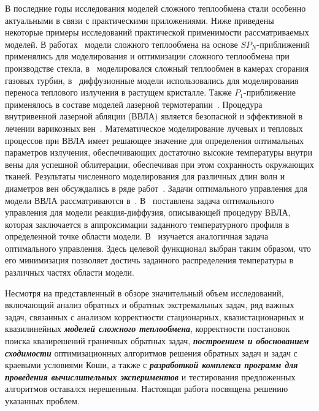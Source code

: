     В последние годы исследования моделей сложного теплообмена стали
    особенно актуальными в связи с практическими приложениями.
    Ниже приведены некоторые примеры исследований практической применимости
    рассматриваемых моделей.
    В работах~\cite{clever2012optimal, clever2014model,
        frank2010optimal, klar2005, lang2005adaptive, farina2011mathematical,
        Thommes2002, Pinnau2007b, Pinnau2004, Seaid2007, Larsen2002}
    модели сложного теплообмена на основе $SP_N$-приближений
    применялись для моделирования и оптимизации сложного теплообмена при
    производстве стекла, в~\cite{frank2004comparison, seaid2004efficient, Seaid2005}
    моделировался сложный теплообмен в
    камерах сгорания газовых турбин, в~\cite{Backofen2004} диффузионные модели
    использовались для моделирования переноса теплового излучения в
    растущем кристалле.
    Также $P_1$-приближение применялось в составе моделей
    лазерной термотерапии~\cite{Dombrovskii2015, Tse2012, Hubner2017}.
    Процедура внутривенной лазерной
    абляции (ВВЛА) является безопасной и эффективной в лечении варикозных
    вен~\cite{Endovenous_vandenBos2009}.
    Математическое моделирование лучевых и тепловых процессов
    при ВВЛА имеет решающее значение для определения оптимальных
    параметров излучения, обеспечивающих достаточно высокие температуры
    внутри вены для успешной облитерации, обеспечивая при этом сохранность
    окружающих тканей.
    Результаты численного моделирования для различных
    длин волн и диаметров вен обсуждались в ряде
    работ~\cite{van2014optical, Some_Poluektova2014, Endovenous_Malskat2014, Mathematical_Mordon2006}.
    Задачи оптимального управления для модели ВВЛА рассматриваются
    в~\cite{Optimal_Kovtanyuk2020, Inverse_Kovtanyuk2021}.
    В~\cite{Optimal_Kovtanyuk2020} поставлена задача оптимального
    управления для модели реакция-диффузия,
    описывающей процедуру ВВЛА, которая заключается в
    аппроксимации заданного температурного профиля в определенной точке
    области модели.
    В~\cite{Inverse_Kovtanyuk2021} изучается аналогичная задача оптимального управления.
    Здесь целевой функционал выбран таким образом, что его
    минимизация позволяет достичь заданного распределения температуры в
    различных частях области модели.


    Несмотря на представленный в обзоре значительный объем исследований,
    включающий анализ обратных и обратных экстремальных задач, ряд важных
    задач, связанных с анализом корректности стационарных,
    квазистационарных и квазилинейных \textit{\textbf{моделей сложного теплообмена}},
    корректности постановок поиска квазирешений граничных обратных задач,
    \textit{\textbf{построением и обоснованием сходимости}} оптимизационных алгоритмов
    решения обратных задач и задач с краевыми условиями Коши, а также с
    \textit{\textbf{разработкой комплекса программ для проведения вычислительных экспериментов}}
    и тестирования предложенных алгоритмов оставался нерешенным.
    Настоящая работа посвящена решению указанных проблем.


